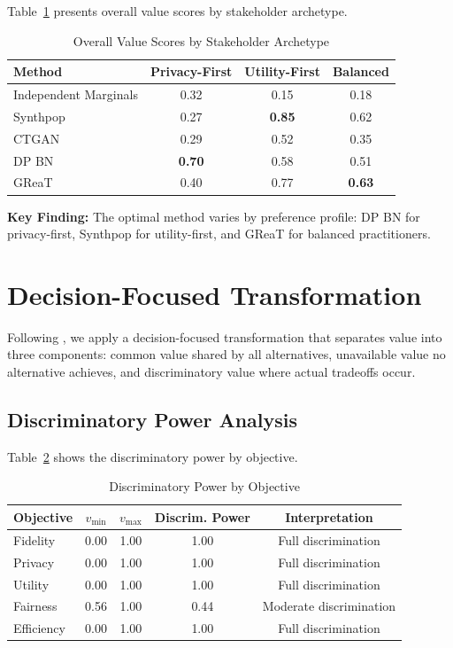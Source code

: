 \documentclass[12pt,a4paper]{article}
\begin{document}
Table~\ref{tab:value} presents overall value scores by stakeholder archetype.

\begin{table}[htbp]
\centering
\caption{Overall Value Scores by Stakeholder Archetype}
\label{tab:value}
\begin{tabular}{@{}lccc@{}}
\toprule
\textbf{Method} & \textbf{Privacy-First} & \textbf{Utility-First} & \textbf{Balanced} \\
\midrule
Independent Marginals & 0.32 & 0.15 & 0.18 \\
Synthpop & 0.27 & \textbf{0.85} & 0.62 \\
CTGAN & 0.29 & 0.52 & 0.35 \\
DP BN & \textbf{0.70} & 0.58 & 0.51 \\
GReaT & 0.40 & 0.77 & \textbf{0.63} \\
\bottomrule
\end{tabular}
\end{table}

\textbf{Key Finding:} The optimal method varies by preference profile: DP BN for privacy-first, Synthpop for utility-first, and GReaT for balanced practitioners.

\section{Decision-Focused Transformation}

Following \citet{dees2010decision}, we apply a decision-focused transformation that separates value into three components: common value shared by all alternatives, unavailable value no alternative achieves, and discriminatory value where actual tradeoffs occur.

\subsection{Discriminatory Power Analysis}

Table~\ref{tab:discriminatory} shows the discriminatory power by objective.

\begin{table}[htbp]
\centering
\caption{Discriminatory Power by Objective}
\label{tab:discriminatory}
\begin{tabular}{@{}lcccc@{}}
\toprule
\textbf{Objective} & $v_{\min}$ & $v_{\max}$ & \textbf{Discrim. Power} & \textbf{Interpretation} \\
\midrule
Fidelity & 0.00 & 1.00 & 1.00 & Full discrimination \\
Privacy & 0.00 & 1.00 & 1.00 & Full discrimination \\
Utility & 0.00 & 1.00 & 1.00 & Full discrimination \\
Fairness & 0.56 & 1.00 & 0.44 & Moderate discrimination \\
Efficiency & 0.00 & 1.00 & 1.00 & Full discrimination \\
\bottomrule
\end{tabular}
\end{table}
\end{document}
